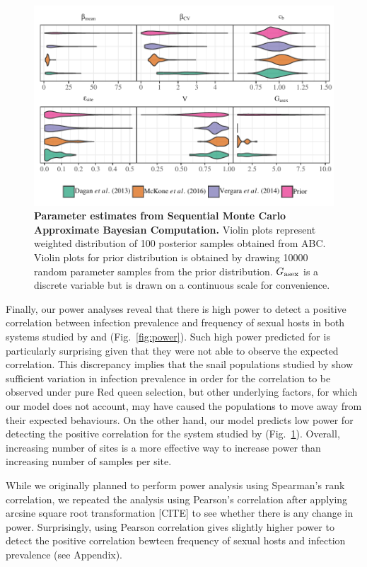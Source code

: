\documentclass{article}\usepackage[]{graphicx}\usepackage[]{color}
\newcommand{\fref}[1]{Fig.~\ref{fig:#1}}
\begin{document}
\begin{figure}[!ht]
\includegraphics[width=\textwidth]{../fig/posterior.pdf}
\caption{{\bf Parameter estimates from Sequential Monte Carlo Approximate Bayesian Computation.}
Violin plots represent weighted distribution of 100 posterior samples obtained from ABC.
Violin plots for prior distribution is obtained by drawing 10000 random parameter samples from the prior distribution.
$G_{\tiny \textrm{asex}}$ is a discrete variable but is drawn on a continuous scale for convenience.
}
\label{fig:smcparam}
\end{figure}

Finally, our power analyses reveal that there is high power to detect a positive correlation between infection prevalence and frequency of sexual hosts in both systems studied by \cite{dagan2013clonal} and \cite{mckone2016fine} (\fref{power}).
Such high power predicted for \cite{dagan2013clonal} is particularly surprising given that they were not able to observe the expected correlation.
This discrepancy implies that the snail populations studied by \cite{dagan2013clonal} show sufficient variation in infection prevalence in order for the correlation to be observed under pure Red queen selection, but other underlying factors, for which our model does not account, may have caused the populations to move away from their expected behaviours.
On the other hand, our model predicts low power for detecting the positive correlation for the system studied by \cite{vergara2014infection} (\fref{smcparam}).
Overall, increasing number of sites is a more effective way to increase power than increasing number of samples per site.

While we originally planned to perform power analysis using Spearman's rank correlation,
we repeated the analysis using Pearson's correlation after applying arcsine square root transformation [CITE] to see whether there is any change in power.
Surprisingly, using Pearson correlation gives slightly higher power to detect the positive correlation bewteen frequency of sexual hosts and infection prevalence (see Appendix).
\end{document}
